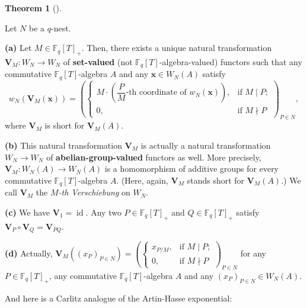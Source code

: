 \documentclass[numbers=enddot,12pt,final,onecolumn,notitlepage]{scrartcl}%
\theoremstyle{definition}
\newtheorem{theo}{Theorem}[section]
\newenvironment{theorem}[1][]
{\begin{theo}[#1]\begin{leftbar}}
{\end{leftbar}\end{theo}}
\begin{document}
\begin{theorem}
\label{thm.carlitz.Witt.ver}Let $N$ be a $q$-nest.

\textbf{(a)} Let $M\in\mathbb{F}_{q}\left[  T\right]  _{+}$. Then, there
exists a unique natural transformation $\mathbf{V}_{M}:W_{N}\rightarrow W_{N}$
of \textbf{set-valued} (not $\mathbb{F}_{q}\left[  T\right]  $-algebra-valued)
functors such that any commutative $\mathbb{F}_{q}\left[  T\right]  $-algebra
$A$ and any $\mathbf{x}\in W_{N}\left(  A\right)  $ satisfy%
\[
w_{N}\left(  \mathbf{V}_{M}\left(  \mathbf{x}\right)  \right)  =\left(
\begin{cases}
M\cdot\left(  \dfrac{P}{M}\text{-th coordinate of }w_{N}\left(  \mathbf{x}%
\right)  \right)  , & \text{if }M\mid P;\\
0, & \text{if }M\nmid P
\end{cases}
\right)  _{P\in N},
\]
where $\mathbf{V}_{M}$ is short for $\mathbf{V}_{M}\left(  A\right)  $.

\textbf{(b)} This natural transformation $\mathbf{V}_{M}$ is actually a
natural transformation $W_{N}\rightarrow W_{N}$ of
\textbf{abelian-group-valued} functors as well. More precisely, $\mathbf{V}%
_{M}:W_{N}\left(  A\right)  \rightarrow W_{N}\left(  A\right)  $ is a
homomorphism of additive groups for every commutative $\mathbb{F}_{q}\left[
T\right]  $-algebra $A$. (Here, again, $\mathbf{V}_{M}$ stands short for
$\mathbf{V}_{M}\left(  A\right)  $.) We call $\mathbf{V}_{M}$ the
$M$\textit{-th Verschiebung} on $W_{N}$.

\textbf{(c)} We have $\mathbf{V}_{1}=\operatorname*{id}$. Any two
$P\in\mathbb{F}_{q}\left[  T\right]  _{+}$ and $Q\in\mathbb{F}_{q}\left[
T\right]  _{+}$ satisfy $\mathbf{V}_{P}\circ\mathbf{V}_{Q}=\mathbf{V}_{PQ}$.

\textbf{(d)} Actually, $\mathbf{V}_{M}\left(  \left(  x_{P}\right)  _{P\in
N}\right)  =\left(
\begin{cases}
x_{P/M}, & \text{if }M\mid P;\\
0, & \text{if }M\nmid P
\end{cases}
\right)  _{P\in N}$ for any $P\in\mathbb{F}_{q}\left[  T\right]  _{+}$, any
commutative $\mathbb{F}_{q}\left[  T\right]  $-algebra $A$ and any $\left(
x_{P}\right)  _{P\in N}\in W_{N}\left(  A\right)  $.
\end{theorem}

And here is a Carlitz analogue of the Artin-Hasse exponential:
\end{document}
